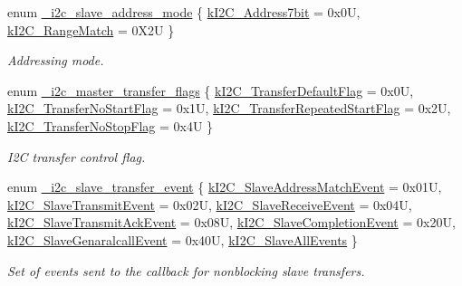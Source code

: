 \begin{DoxyCompactItemize}
enum \mbox{\hyperlink{group__i2c__driver_gae1e1e45d8491652a249bf48530911ac7}{\+\_\+i2c\+\_\+slave\+\_\+address\+\_\+mode}} \{ \mbox{\hyperlink{group__i2c__driver_ggae1e1e45d8491652a249bf48530911ac7a3e2c7f1f917939d0d7595224e3700dd4}{k\+I2\+C\+\_\+\+Address7bit}} = 0x0U, 
\mbox{\hyperlink{group__i2c__driver_ggae1e1e45d8491652a249bf48530911ac7aa2c312f87691c542c466ff747d21f70a}{k\+I2\+C\+\_\+\+Range\+Match}} = 0X2U
 \}
\begin{DoxyCompactList}\small\item\em Addressing mode. \end{DoxyCompactList}\item 
enum \mbox{\hyperlink{group__i2c__driver_ga87ea07668194cfb46c7c368d2cb42433}{\+\_\+i2c\+\_\+master\+\_\+transfer\+\_\+flags}} \{ \mbox{\hyperlink{group__i2c__driver_gga87ea07668194cfb46c7c368d2cb42433ae80f7b768b1621e42ac965d3d23de5e2}{k\+I2\+C\+\_\+\+Transfer\+Default\+Flag}} = 0x0U, 
\mbox{\hyperlink{group__i2c__driver_gga87ea07668194cfb46c7c368d2cb42433a5cb44bf860c0482c0ca0165cf0d31d8a}{k\+I2\+C\+\_\+\+Transfer\+No\+Start\+Flag}} = 0x1U, 
\mbox{\hyperlink{group__i2c__driver_gga87ea07668194cfb46c7c368d2cb42433aadf112471ef12f194985a093cd9b9721}{k\+I2\+C\+\_\+\+Transfer\+Repeated\+Start\+Flag}} = 0x2U, 
\mbox{\hyperlink{group__i2c__driver_gga87ea07668194cfb46c7c368d2cb42433afb8aeea71b5b7475e3d3df86220db566}{k\+I2\+C\+\_\+\+Transfer\+No\+Stop\+Flag}} = 0x4U
 \}
\begin{DoxyCompactList}\small\item\em I2C transfer control flag. \end{DoxyCompactList}\item 
enum \mbox{\hyperlink{group__i2c__driver_ga87e42e170b60f17f657ef3c06a918133}{\+\_\+i2c\+\_\+slave\+\_\+transfer\+\_\+event}} \{ \newline
\mbox{\hyperlink{group__i2c__driver_gga87e42e170b60f17f657ef3c06a918133acb1ae174dd6798a6fd79800a9e39a3c6}{k\+I2\+C\+\_\+\+Slave\+Address\+Match\+Event}} = 0x01U, 
\mbox{\hyperlink{group__i2c__driver_gga87e42e170b60f17f657ef3c06a918133a2f85039a57379838909876a1d509b7aa}{k\+I2\+C\+\_\+\+Slave\+Transmit\+Event}} = 0x02U, 
\mbox{\hyperlink{group__i2c__driver_gga87e42e170b60f17f657ef3c06a918133aac8593e808a8137d1b5d3a51640779de}{k\+I2\+C\+\_\+\+Slave\+Receive\+Event}} = 0x04U, 
\mbox{\hyperlink{group__i2c__driver_gga87e42e170b60f17f657ef3c06a918133a43c045da27fa60e7a0540c743eca4e79}{k\+I2\+C\+\_\+\+Slave\+Transmit\+Ack\+Event}} = 0x08U, 
\newline
\mbox{\hyperlink{group__i2c__driver_gga87e42e170b60f17f657ef3c06a918133a38cca3cd668e73f51b8e574835d419df}{k\+I2\+C\+\_\+\+Slave\+Completion\+Event}} = 0x20U, 
\mbox{\hyperlink{group__i2c__driver_gga87e42e170b60f17f657ef3c06a918133a5063c09cccc4d8047aa3d33ff979657b}{k\+I2\+C\+\_\+\+Slave\+Genaralcall\+Event}} = 0x40U, 
\mbox{\hyperlink{group__i2c__driver_gga87e42e170b60f17f657ef3c06a918133a94b030ebdac378a84961893ae567bfbc}{k\+I2\+C\+\_\+\+Slave\+All\+Events}}
 \}
\begin{DoxyCompactList}\small\item\em Set of events sent to the callback for nonblocking slave transfers. \end{DoxyCompactList}\end{DoxyCompactItemize}
